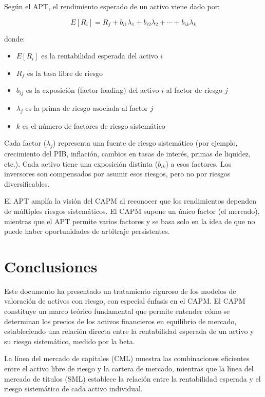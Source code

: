 \begin{teorema}
Según el APT, el rendimiento esperado de un activo viene dado por:

\begin{equation}
E[R_i] = R_f + b_{i1}\lambda_1 + b_{i2}\lambda_2 + \cdots + b_{ik}\lambda_k
\end{equation}

donde:
\begin{itemize}
\item $E[R_i]$ es la rentabilidad esperada del activo $i$
\item $R_f$ es la tasa libre de riesgo
\item $b_{ij}$ es la exposición (factor loading) del activo $i$ al factor de riesgo $j$
\item $\lambda_j$ es la prima de riesgo asociada al factor $j$
\item $k$ es el número de factores de riesgo sistemático
\end{itemize}
\end{teorema}

Cada factor ($\lambda_j$) representa una fuente de riesgo sistemático (por ejemplo, crecimiento del PIB, inflación, cambios en tasas de interés, primas de liquidez, etc.). Cada activo tiene una exposición distinta ($b_{ik}$) a esos factores. Los inversores son compensados por asumir esos riesgos, pero no por riesgos diversificables.

El APT amplía la visión del CAPM al reconocer que los rendimientos dependen de múltiples riesgos sistemáticos. El CAPM supone un único factor (el mercado), mientras que el APT permite varios factores y se basa solo en la idea de que no puede haber oportunidades de arbitraje persistentes.

\section{Conclusiones}

Este documento ha presentado un tratamiento riguroso de los modelos de valoración de activos con riesgo, con especial énfasis en el CAPM. El CAPM constituye un marco teórico fundamental que permite entender cómo se determinan los precios de los activos financieros en equilibrio de mercado, estableciendo una relación directa entre la rentabilidad esperada de un activo y su riesgo sistemático, medido por la beta.

La línea del mercado de capitales (CML) muestra las combinaciones eficientes entre el activo libre de riesgo y la cartera de mercado, mientras que la línea del mercado de títulos (SML) establece la relación entre la rentabilidad esperada y el riesgo sistemático de cada activo individual.

